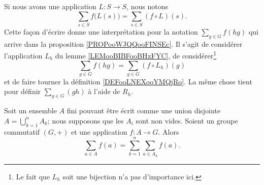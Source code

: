 Si nous avons une application \( L\colon S\to S\), nous notons
\begin{equation}
    \sum_{s\in S}f\big( L(s) \big)=\sum_{s\in S}(f\circ L)(s).
\end{equation}
Cette façon d'écrire donne une interprétation pour la notation \( \sum_{g\in G}f(hg)\) qui arrive dans la proposition \ref{PROPooWJQQooFINSEc}. Il s'agit de considérer l'application \( L_h\) du lemme \ref{LEMooBIBFooBHxFYC}, de considérer\footnote{Le fait que \( L_h\) soit une bijection n'a pas d'importance ici.}
\begin{equation}        \label{EQooQQBEooFDOBVG}
    \sum_{g\in G}f(hg)=\sum_{g\in G}(f\circ L_h)(g)
\end{equation}
et de faire tourner la définition \ref{DEFooLNEXooYMQjRo}. La même chose tient pour définir \( \sum_{g\in G}(gh)\) à l'aide de \( R_h\).


\begin{lemma}
    Soit un ensemble \( A\) fini pouvant être écrit comme une union disjointe \( A=\bigcup_{k=1}^nA_k\); nous supposons que les \( A_i\) sont non vides. Soient un groupe commutatif \( (G,+)\) et une application \( f\colon A\to G\). Alors
    \begin{equation}
        \sum_{a\in A}f(a)=\sum_{k=1}^n\sum_{a\in A_k}f(a).
    \end{equation}
\end{lemma}


